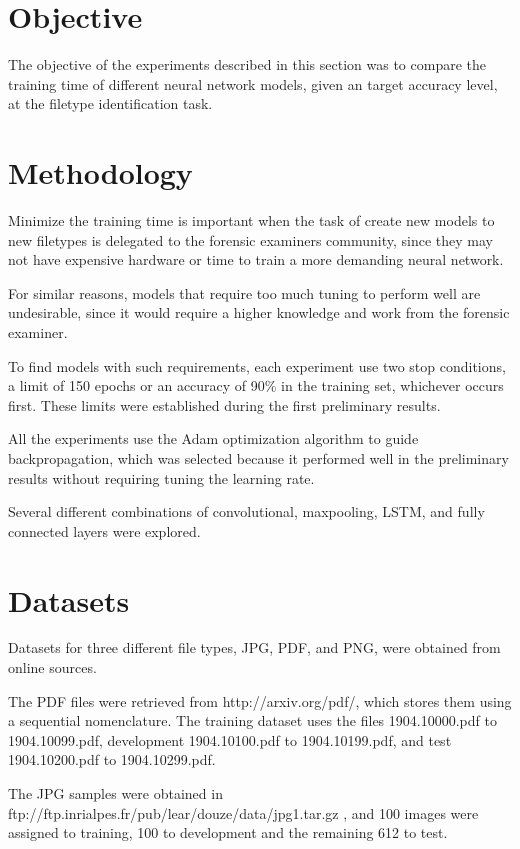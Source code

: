 \section{Objective}
The objective of the experiments described in this section 
was to compare the training time of different neural network models, given an target accuracy level, at the filetype identification task.

\section{Methodology}

Minimize the training time is important when the task of create new models to new filetypes is delegated to the forensic examiners community, since they may not have expensive hardware or time to train a more demanding neural network.

For similar reasons, models that require too much tuning to perform well are undesirable, since it would require a higher knowledge and work from the forensic examiner.


To find models with such requirements, each experiment use two stop conditions, a limit of 150 epochs or an accuracy of 90\% in the training set, whichever occurs first. These limits were established during the first preliminary results. 

All the experiments use the Adam
optimization algorithm to guide backpropagation, which was selected because it performed well in the preliminary results without requiring tuning the learning rate.

Several different combinations of convolutional, maxpooling, LSTM, and fully connected layers were explored.

\section{Datasets}

Datasets for three different file types, JPG, PDF, and PNG, were obtained from online sources.

The PDF files were retrieved from http://arxiv.org/pdf/, which stores them using a sequential nomenclature. The training dataset uses the files 1904.10000.pdf to 1904.10099.pdf, development 1904.10100.pdf to 1904.10199.pdf, and test 1904.10200.pdf to 1904.10299.pdf. 

The JPG samples were obtained in ftp://ftp.inrialpes.fr/pub/lear/douze/data/jpg1.tar.gz , and 100 images were assigned to training, 100 to development and the remaining 612 to test.

